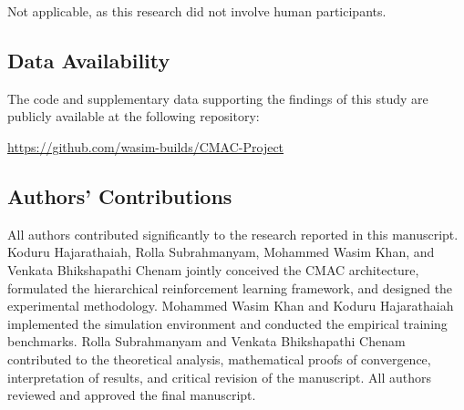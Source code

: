 \documentclass[pdflatex,sn-mathphys-num]{sn-jnl}
\begin{document}
Not applicable, as this research did not involve human participants.

\subsection*{Data Availability}

The code and supplementary data supporting the findings of this study are publicly available at the following repository:

\url{https://github.com/wasim-builds/CMAC-Project}

\subsection*{Authors' Contributions}

All authors contributed significantly to the research reported in this manuscript. Koduru Hajarathaiah, Rolla Subrahmanyam, Mohammed Wasim Khan, and Venkata Bhikshapathi Chenam jointly conceived the CMAC architecture, formulated the hierarchical reinforcement learning framework, and designed the experimental methodology. Mohammed Wasim Khan and Koduru Hajarathaiah implemented the simulation environment and conducted the empirical training benchmarks. Rolla Subrahmanyam and Venkata Bhikshapathi Chenam contributed to the theoretical analysis, mathematical proofs of convergence, interpretation of results, and critical revision of the manuscript. All authors reviewed and approved the final manuscript.
\end{document}
